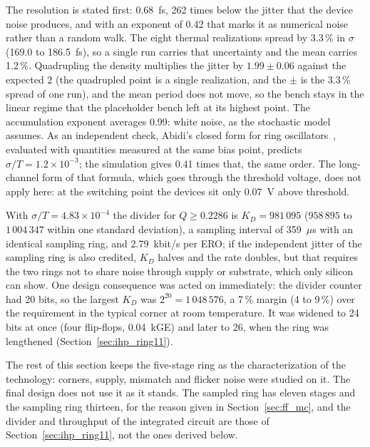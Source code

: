 The resolution is stated first: 0.68~fs, 262 times below the jitter that
the device noise produces, and with an exponent of 0.42 that marks it as
numerical noise rather than a random walk. The eight thermal realizations
spread by 3.3\,\% in $\sigma$ (169.0 to 186.5~fs), so a single run carries
that uncertainty and the mean carries 1.2\,\%. Quadrupling the density
multiplies the jitter by $1.99 \pm 0.06$ against the expected 2 (the
quadrupled point is a single realization, and the $\pm$ is the 3.3\,\%
spread of one run), and the
mean period does not move, so the bench stays in the linear regime that
the placeholder bench left at its highest point. The accumulation
exponent averages 0.99: white noise, as the stochastic model assumes. As
an independent check, Abidi's closed form for ring
oscillators~\cite{abidi_2006_ring}, evaluated with quantities measured at
the same bias point, predicts $\sigma/T = 1.2\times10^{-3}$; the
simulation gives 0.41 times that, the same order. The long-channel form of that formula, which goes through
the threshold voltage, does not apply here: at the switching point the
devices sit only 0.07~V above threshold.

With $\sigma/T = 4.83\times10^{-4}$ the divider for $Q \ge 0.2286$ is
$K_D = 981\,095$ ($958\,895$ to $1\,004\,347$ within one standard
deviation), a sampling interval of 359~$\mu$s with an identical
sampling ring, and 2.79~kbit/s per \ac{ERO}; if the independent jitter of
the sampling ring is also credited, $K_D$ halves and the rate doubles,
but that requires the two rings not to share noise through supply or
substrate, which only silicon can show. One design consequence was acted
on immediately: the divider counter had 20 bits, so the largest $K_D$ was
$2^{20} = 1\,048\,576$, a 7\,\% margin (4 to 9\,\%) over the requirement
in the typical corner at room temperature. It was widened to 24 bits at
once (four flip-flops, 0.04~kGE) and later to 26, when the ring was
lengthened (Section~\ref{sec:ihp_ring11}).

The rest of this section keeps the five-stage ring as the
characterization of the technology: corners, supply, mismatch and flicker
noise were studied on it. The final design does not use it as it stands.
The sampled ring has eleven stages and the sampling ring thirteen, for
the reason given in Section~\ref{sec:ff_mc}, and the divider and
throughput of the integrated circuit are those of
Section~\ref{sec:ihp_ring11}, not the ones derived below.

